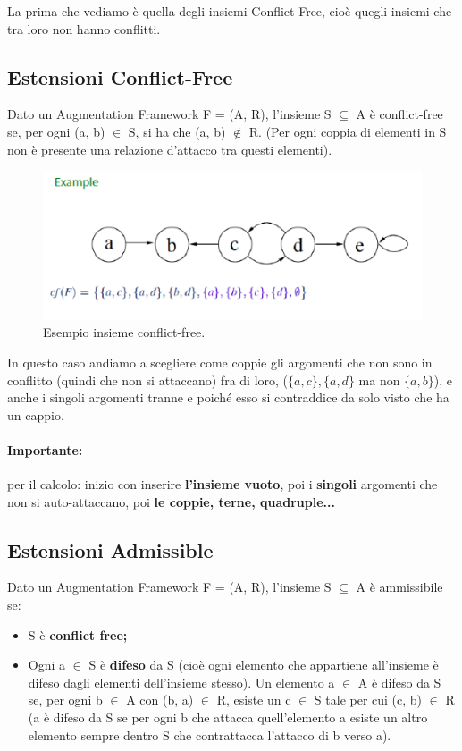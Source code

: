 La prima che vediamo è quella degli insiemi Conflict Free, cioè
quegli insiemi che tra loro non hanno conflitti.

\subsection{Estensioni Conflict-Free}
Dato un Augmentation Framework F = (A, R), l'insieme S $\subseteq$ A è
conflict-free se, per ogni (a, b) $\in$ S, si ha che (a, b) $\notin$ R. (Per
ogni coppia di elementi in S non è presente una relazione d'attacco tra questi
elementi).

\begin{figure}[H]
    \centering
    \includegraphics[width=12cm, keepaspectratio]{capitoli/img/Cap6/cf.png}
    \caption{Esempio insieme conflict-free.}
\end{figure}

In questo caso andiamo a scegliere come coppie gli argomenti che non sono in
conflitto (quindi che non si attaccano) fra di loro, ($\{a,c\},\{a,d\}$ ma non $\{a,b\}$),
e anche i singoli argomenti tranne e poiché esso si contraddice da solo visto
che ha un cappio.

\paragraph{Importante:} per il calcolo: inizio con inserire
\textbf{l'insieme vuoto}, poi i \textbf{singoli} argomenti che non si
auto-attaccano, poi \textbf{le coppie, terne, quadruple...}

\subsection{Estensioni Admissible}
Dato un Augmentation Framework F = (A, R), l'insieme S $\subseteq$ A è
ammissibile se:
\begin{itemize}
    \item S è \textbf{conflict free;}
    \item Ogni a $\in$ S è \textbf{difeso} da S (cioè ogni elemento che
          appartiene all'insieme è difeso dagli elementi dell'insieme stesso). Un
          elemento a $\in$ A è difeso da S se, per ogni b $\in$ A con (b, a) $\in$ R,
          esiste un c $\in$ S tale per cui (c, b) $\in$ R (a è difeso da S se per ogni
          b che attacca quell'elemento a esiste un altro elemento sempre dentro S che
          contrattacca l'attacco di b verso a).
\end{itemize}

